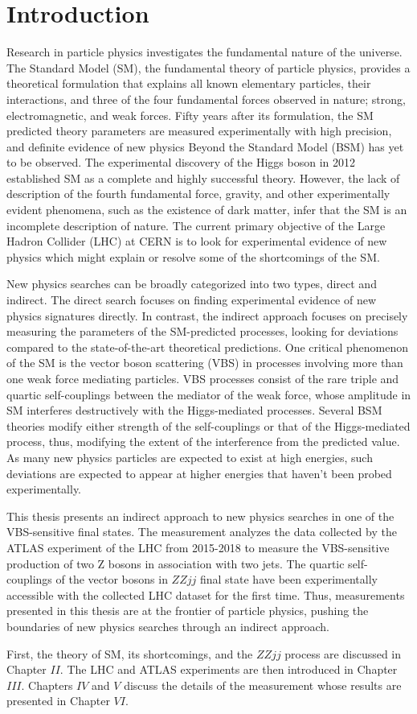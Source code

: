 \part{\LARGE{Introduction}}
\label{sec:Introduction}

Research in particle physics investigates the fundamental nature of the universe. The Standard Model (SM), the fundamental theory of particle physics, provides a theoretical formulation that explains all known elementary particles, their interactions, and three of the four fundamental forces observed in nature; strong, electromagnetic, and weak forces. Fifty years after its formulation, the SM predicted theory parameters are measured experimentally with high precision, and definite evidence of new physics Beyond the Standard Model (BSM) has yet to be observed. The experimental discovery of the Higgs boson in 2012 established SM as a complete and highly successful theory. However, the lack of description of the fourth fundamental force, gravity, and other experimentally evident phenomena, such as the existence of dark matter, infer that the SM is an incomplete description of nature. The current primary objective of the Large Hadron Collider (LHC) at CERN is to look for experimental evidence of new physics which might explain or resolve some of the shortcomings of the SM. 

New physics searches can be broadly categorized into two types, direct and indirect. The direct search focuses on finding experimental evidence of new physics signatures directly. In contrast, the indirect approach focuses on precisely measuring the parameters of the SM-predicted processes, looking for deviations compared to the state-of-the-art theoretical predictions. One critical phenomenon of the SM is the vector boson scattering (VBS) in processes involving more than one weak force mediating particles. VBS processes consist of the rare triple and quartic self-couplings between the mediator of the weak force, whose amplitude in SM interferes destructively with the Higgs-mediated processes. Several BSM theories modify either strength of the self-couplings or that of the Higgs-mediated process, thus, modifying the extent of the interference from the predicted value. As many new physics particles are expected to exist at high energies, such deviations are expected to appear at higher energies that haven't been probed experimentally. 

This thesis presents an indirect approach to new physics searches in one of the VBS-sensitive final states. The measurement analyzes the data collected by the ATLAS experiment of the LHC from 2015-2018 to measure the VBS-sensitive production of two Z bosons in association with two jets. The quartic self-couplings of the vector bosons in $ZZjj$ final state have been experimentally accessible with the collected LHC dataset for the first time. Thus, measurements presented in this thesis are at the frontier of particle physics, pushing the boundaries of new physics searches through an indirect approach. 

First, the theory of SM, its shortcomings, and the $ZZjj$ process are discussed in Chapter $II$. The LHC and ATLAS experiments are then introduced in Chapter $III$. Chapters $IV$ and $V$ discuss the details of the measurement whose results are presented in Chapter $VI$. 
